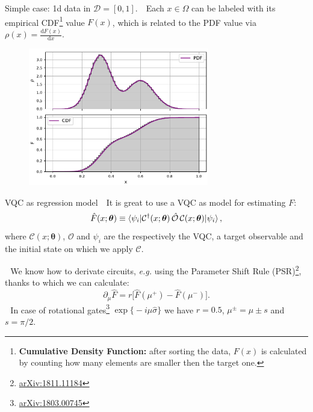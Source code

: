 \documentclass[8pt, xcolor={svgnames}, hyperref={colorlinks, linkcolor=black, citecolor=amethyst, urlcolor=amethyst}]{beamer}
\begin{document}
\begin{frame}{Simple case: 1d data in $\mathcal{D} = [0,1]$.}
\large
\faArrowCircleRight\,\, Each  $x\in \Omega$ can be labeled with its 
empirical CDF\footnote{\textbf{Cumulative Density Function:} after sorting the data,
$F(x)$ is calculated by counting how many elements are smaller then the target one.} value $F(x)$,
which is related to the PDF value via $\rho(x) = \frac{\text{d}F(x)}{\text{d} x}$. 

\begin{figure}
    \includegraphics[width=0.7\textwidth]{figures/pdf_cdf.pdf}
\end{figure}
\end{frame}


\begin{frame}[fragile]{VQC as regression model}
\large
\faArrowCircleRight\,\, It is great to use a VQC as model for estimating $F$:
\pause
\begin{equation}
    \hat{F}(x; \bm{\theta}) \equiv 
    \braket{\psi_i | \mathcal{C}^{\dagger}(x;\bm{\theta})\,  \hat{\mathcal{O}} \, 
    \mathcal{C}(x;\bm{\theta}) | \psi_i},
    \label{eq:estimated_y}
\end{equation}
where $\mathcal{C}(x; \bm{\theta})$, $\mathcal{O}$ and $\psi_i$ are the respectively the 
VQC, a target observable and the initial state on which we apply $\mathcal{C}$.

\pause
\faArrowCircleRight\,\, We know how to derivate circuits, \textit{e.g.} using the
Parameter Shift Rule (PSR)\footnote<3->{\href{https://arxiv.org/abs/1811.11184}{arXiv:1811.11184}}, thanks to which we can 
calculate:
\begin{equation}
\partial_{\mu}\hat{F} = r \bigl[\hat{F}(\mu^+) - \hat{F}(\mu^-) \bigr].
\label{eq:psr}
\end{equation}  
\pause
\faArrowCircleRight\,\, In case of rotational 
gates\footnote<4->{\href{https://arxiv.org/abs/1803.00745}{arXiv:1803.00745}} 
 $\exp{\bigl\{-i\mu \hat{\sigma}\bigr\} }$ 
we have $r=0.5$, $\mu^{\pm} = \mu \pm s$ and $s=\pi/2$. 
\end{frame}
\end{document}
